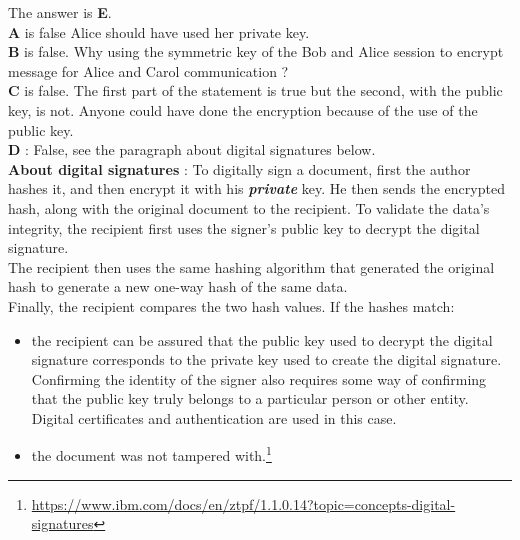 \documentclass[en]{sourcefiles/eplexam}
\begin{document}
\begin{solution}
The answer is \textbf{E}.\\
\noindent \textbf{A} is false Alice should have used her private key.\\

\noindent \textbf{B} is false. Why using the symmetric key of the Bob and Alice session to encrypt message for Alice and Carol communication ?\\

\noindent \textbf{C} is false. The first part of the statement is true but the second, with the public key, is not. Anyone could have done the encryption because of the use of the public key.\\

\noindent \textbf{D} : False, see the paragraph about digital signatures below.\\


\noindent \textbf{About digital signatures} : To digitally sign a document, first the author hashes it, and then encrypt it with his \textbf{\textit{private}} key. He then sends the encrypted hash, along with the original document to the recipient. To validate the data's integrity, the recipient first uses the signer's public key to decrypt the digital signature.\\
The recipient then uses the same hashing algorithm that generated the original hash to generate a new one-way hash of the same data.\\
\noindent Finally, the recipient compares the two hash values. If the hashes match:
\begin{itemize}
    \item the recipient can be assured that the public key used to decrypt the digital signature corresponds to the private key used to create the digital signature. Confirming the identity of the signer also requires some way of confirming that the public key truly belongs to a particular person or other entity. Digital certificates and authentication are used in this case.
    \item the document was not tampered with.\footnote{\url{https://www.ibm.com/docs/en/ztpf/1.1.0.14?topic=concepts-digital-signatures}}
\end{itemize}
\end{solution}
\end{document}
